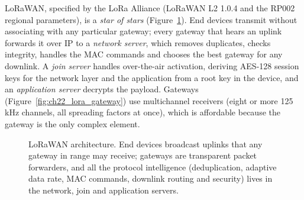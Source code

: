 LoRaWAN, specified by the LoRa Alliance (LoRaWAN L2 1.0.4 and the RP002 regional parameters), is a
\emph{star of stars} (Figure~\ref{fig:ch22_lorawan}). End devices transmit without associating with
any particular gateway; every gateway that hears an uplink forwards it over IP to a \emph{network
server}, which removes duplicates, checks integrity, handles the MAC commands and chooses the best
gateway for any downlink. A \emph{join server} handles over-the-air activation, deriving AES-128
session keys for the network layer and the application from a root key in the device, and an
\emph{application server} decrypts the payload. Gateways (Figure~\ref{fig:ch22_lora_gateway}) use multichannel receivers (eight or more
125\,kHz channels, all spreading factors at once), which is affordable because the gateway is the only
complex element.

\begin{figure}[htbp]\centering
{}
\caption{LoRaWAN architecture. End devices broadcast uplinks that any gateway in range may receive;
gateways are transparent packet forwarders, and all the protocol intelligence (deduplication,
adaptive data rate, MAC commands, downlink routing and security) lives in the network, join and
application servers.}
\label{fig:ch22_lorawan}
\end{figure}

